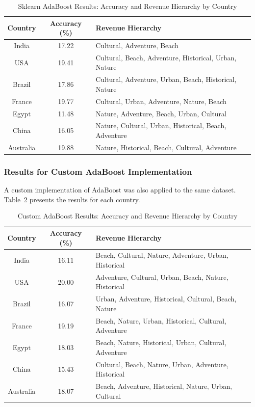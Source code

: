 \documentclass{article}
\begin{document}
\begin{table}[H]
\centering
\begin{tabular}{|c|c|l|}
\hline
\textbf{Country} & \textbf{Accuracy (\%)} & \textbf{Revenue Hierarchy} \\ \hline
India & 17.22 & Cultural, Adventure, Beach \\
USA & 19.41 & Cultural, Beach, Adventure, Historical, Urban, Nature \\
Brazil & 17.86 & Cultural, Adventure, Urban, Beach, Historical, Nature \\
France & 19.77 & Cultural, Urban, Adventure, Nature, Beach \\
Egypt & 11.48 & Nature, Adventure, Beach, Urban, Cultural \\
China & 16.05 & Nature, Cultural, Urban, Historical, Beach, Adventure \\
Australia & 19.88 & Nature, Historical, Beach, Cultural, Adventure \\ \hline
\end{tabular}
\caption{Sklearn AdaBoost Results: Accuracy and Revenue Hierarchy by Country}
\label{tab:sklearn_adaboost_results}
\end{table}

\subsubsection{Results for Custom AdaBoost Implementation}

A custom implementation of AdaBoost was also applied to the same dataset. Table~\ref{tab:custom_adaboost_results} presents the results for each country.

\begin{table}[H]
\centering
\begin{tabular}{|c|c|l|}
\hline
\textbf{Country} & \textbf{Accuracy (\%)} & \textbf{Revenue Hierarchy} \\ \hline
India & 16.11 & Beach, Cultural, Nature, Adventure, Urban, Historical \\
USA & 20.00 & Adventure, Cultural, Urban, Beach, Nature, Historical \\
Brazil & 16.07 & Urban, Adventure, Historical, Cultural, Beach, Nature \\
France & 19.19 & Beach, Nature, Urban, Historical, Cultural, Adventure \\
Egypt & 18.03 & Beach, Nature, Historical, Urban, Cultural, Adventure \\
China & 15.43 & Cultural, Beach, Nature, Urban, Adventure, Historical \\
Australia & 18.07 & Beach, Adventure, Historical, Nature, Urban, Cultural \\ \hline
\end{tabular}
\caption{Custom AdaBoost Results: Accuracy and Revenue Hierarchy by Country}
\label{tab:custom_adaboost_results}
\end{table}
\end{document}
